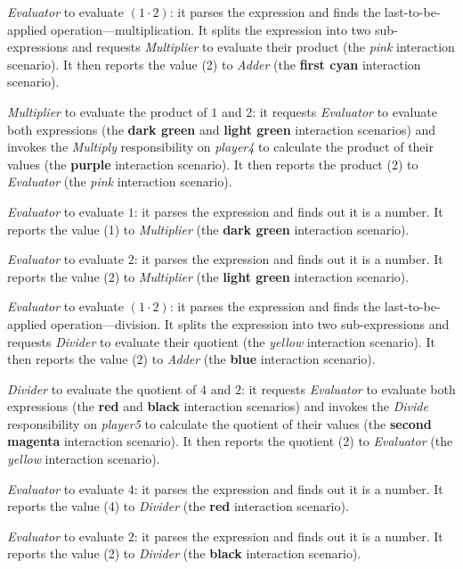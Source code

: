 \textit{Evaluator} to evaluate $(1\cdot2)$: it parses the expression and finds the last-to-be-applied operation---multiplication.
It splits the expression into two sub-expressions and requests \textit{Multiplier} to evaluate their product (the \textit{pink} interaction scenario).
It then reports the value (2) to \textit{Adder} (the \textbf{first cyan} interaction scenario).

\textit{Multiplier} to evaluate the product of $1$ and $2$: it requests \textit{Evaluator} to evaluate both expressions (the \textbf{dark green} and \textbf{light green} interaction scenarios) and invokes the \textit{Multiply} responsibility on \textit{player4} to calculate the product of their values (the \textbf{purple} interaction scenario).
It then reports the product (2) to \textit{Evaluator} (the \textit{pink} interaction scenario).

\textit{Evaluator} to evaluate $1$: it parses the expression and finds out it is a number.
It reports the value (1) to \textit{Multiplier} (the \textbf{dark green} interaction scenario).

\textit{Evaluator} to evaluate $2$: it parses the expression and finds out it is a number.
It reports the value (2) to \textit{Multiplier} (the \textbf{light green} interaction scenario).

\textit{Evaluator} to evaluate $(1\cdot2)$: it parses the expression and finds the last-to-be-applied operation---division.
It splits the expression into two sub-expressions and requests \textit{Divider} to evaluate their quotient (the \textit{yellow} interaction scenario).
It then reports the value (2) to \textit{Adder} (the \textbf{blue} interaction scenario).

\textit{Divider} to evaluate the quotient of $4$ and $2$: it requests \textit{Evaluator} to evaluate both expressions (the \textbf{red} and \textbf{black} interaction scenarios) and invokes the \textit{Divide} responsibility on \textit{player5} to calculate the quotient of their values (the \textbf{second magenta} interaction scenario).
It then reports the quotient (2) to \textit{Evaluator} (the \textit{yellow} interaction scenario).

\textit{Evaluator} to evaluate $4$: it parses the expression and finds out it is a number.
It reports the value (4) to \textit{Divider} (the \textbf{red} interaction scenario).

\textit{Evaluator} to evaluate $2$: it parses the expression and finds out it is a number.
It reports the value (2) to \textit{Divider} (the \textbf{black} interaction scenario).

